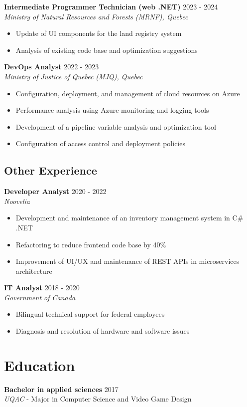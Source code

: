 ﻿\documentclass[11pt,letterpaper]{article}
\begin{document}
\textbf{Intermediate Programmer Technician (web .NET)} \hfill 2023 - 2024\\
\textit{Ministry of Natural Resources and Forests (MRNF), Quebec}
\begin{itemize}
\item Update of UI components for the land registry system
\item Analysis of existing code base and optimization suggestions
\end{itemize}

\textbf{DevOps Analyst} \hfill 2022 - 2023\\
\textit{Ministry of Justice of Quebec (MJQ), Quebec}
\begin{itemize}
\item Configuration, deployment, and management of cloud resources on Azure
\item Performance analysis using Azure monitoring and logging tools
\item Development of a pipeline variable analysis and optimization tool
\item Configuration of access control and deployment policies
\end{itemize}

\subsection*{Other Experience}

\textbf{Developer Analyst} \hfill 2020 - 2022\\
\textit{Noovelia}
\begin{itemize}
\item Development and maintenance of an inventory management system in C\# .NET
\item Refactoring to reduce frontend code base by 40\%
\item Improvement of UI/UX and maintenance of REST APIs in microservices architecture
\end{itemize}

\textbf{IT Analyst} \hfill 2018 - 2020\\
\textit{Government of Canada}
\begin{itemize}
\item Bilingual technical support for federal employees
\item Diagnosis and resolution of hardware and software issues
\end{itemize}

\section*{Education}
\textbf{Bachelor in applied sciences} \hfill 2017\\
\textit{UQAC} - Major in Computer Science and Video Game Design
\end{document}
